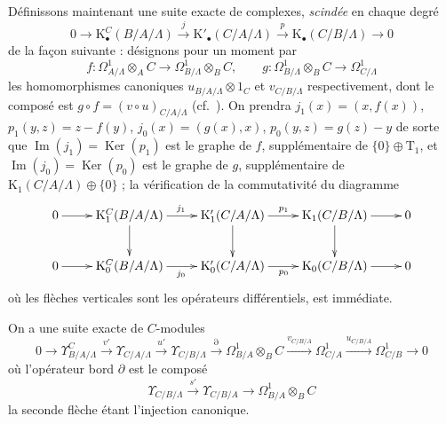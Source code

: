 \begin{env}[20.6.16]
\label{0.20.6.16-fr}
Définissons maintenant une suite exacte de complexes, \emph{scindée} en chaque
degré
\begin{equation}
\tag{20.6.16.1}
\label{0.20.6.16.1-fr}
  0\to\mathrm{K}^C_\bullet(B/A/\Lambda)
  \xrightarrow{j}\mathrm{K}'_\bullet(C/A/\Lambda)
  \xrightarrow{p}\mathrm{K}_\bullet(C/B/\Lambda)\to0
\end{equation}
de la façon suivante : désignons pour un moment par
\[
  f:\Omega^1_{A/\Lambda}\otimes_A C\to
    \Omega^1_{B/\Lambda}\otimes_B C,
  \qquad
  g:\Omega^1_{B/\Lambda}\otimes_B C\to\Omega^1_{C/\Lambda}
\]
les homomorphismes canoniques $u_{B/A/\Lambda}\otimes1_C$ et
$v_{C/B/\Lambda}$ respectivement, dont le composé est
$g\circ f=(v\circ u)_{C/A/\Lambda}$ (cf.\ ).
On prendra $j_1(x)=(x,f(x))$, $p_1(y,z)=z-f(y)$,
$j_0(x)=(g(x),x)$, $p_0(y,z)=g(z)-y$ de sorte que
$\operatorname{Im}(j_1)=\operatorname{Ker}(p_1)$ est le graphe de $f$,
supplémentaire de $\{0\}\oplus\mathrm{T}_1$, et
$\operatorname{Im}(j_0)=\operatorname{Ker}(p_0)$ est le graphe de $g$,
supplémentaire de $\mathrm{K}_1(C/A/\Lambda)\oplus\{0\}$ ; la vérification
de la commutativité du diagramme
\[
\xymatrix{
  0 \ar[r] & \mathrm{K}^C_1(B/A/\Lambda) \ar[r]^{j_1} \ar[d] &
  \mathrm{K}'_1(C/A/\Lambda) \ar[r]^{p_1} \ar[d] &
  \mathrm{K}_1(C/B/\Lambda) \ar[r] \ar[d] & 0 \\
  0 \ar[r] & \mathrm{K}^C_0(B/A/\Lambda) \ar[r]_{j_0} &
  \mathrm{K}'_0(C/A/\Lambda) \ar[r]_{p_0} &
  \mathrm{K}_0(C/B/\Lambda) \ar[r] & 0
}
\]
où les flèches verticales sont les opérateurs différentiels, est immédiate.
\end{env}

\begin{theorem}[20.6.17]
\label{0.20.6.17-fr}
On a une suite exacte de $C$-modules
\begin{equation}
\tag{20.6.17.1}
\label{0.20.6.17.1-fr}
  0\to\Upsilon^C_{B/A/\Lambda}\xrightarrow{v'}
  \Upsilon_{C/A/\Lambda}\xrightarrow{u'}
  \Upsilon_{C/B/\Lambda}\xrightarrow{\partial}
  \Omega^1_{B/A}\otimes_B C\xrightarrow{v_{C/B/A}}
  \Omega^1_{C/A}\xrightarrow{u_{C/B/A}}\Omega^1_{C/B}\to0
\end{equation}
où l'opérateur bord $\partial$ est le composé
\begin{equation}
\tag{20.6.17.2}
\label{0.20.6.17.2-fr}
  \Upsilon_{C/B/\Lambda}\xrightarrow{s'}\Upsilon_{C/B/A}
  \longrightarrow\Omega^1_{B/A}\otimes_B C
\end{equation}
la seconde flèche étant l'injection canonique.
\end{theorem}


